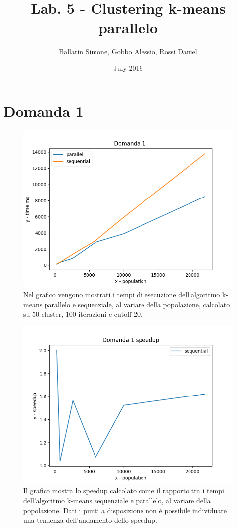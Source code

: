 \documentclass{article}
\title{Lab. 5 - Clustering k-means parallelo}
\author{Ballarin Simone, Gobbo Alessio, Rossi Daniel}
\date{July 2019}
\begin{document}
\maketitle

\section*{Domanda 1}
\begin{center}
	\begin{figure}[H]
		\hspace*{1.5cm}\includegraphics[width=0.7\linewidth, valign=t]{figures/domanda1}
		\caption*{Nel grafico vengono mostrati i tempi di esecuzione dell'algoritmo k-means parallelo e sequenziale, al variare della popolazione, calcolato su 50 cluster, 100 iterazioni e cutoff 20.}
	\end{figure}
\end{center}
\begin{center}
	\begin{figure}[H]
		\hspace*{1.5cm}\includegraphics[width=0.7\linewidth, valign=t]{figures/domanda1speedup}
		\caption*{Il grafico mostra lo speedup calcolato come il rapporto tra i tempi dell'algoritmo k-means sequenziale e parallelo, al variare della popolazione. Dati i punti a disposizione non è possibile individuare una tendenza dell'andamento dello speedup.}
	\end{figure}
\end{center}
\end{document}
